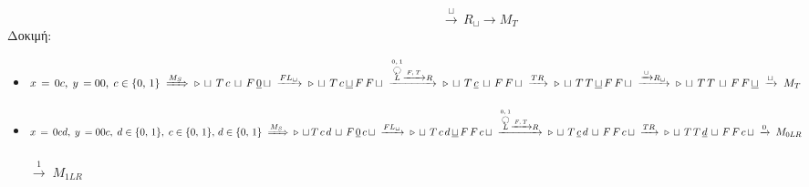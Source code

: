 \reducevspace\reducevspace\reducevspace\reducevspace\reducevspace\reducevspace\reducevspace\reducevspace\reducevspace
\reducevspace\reducevspace\reducevspace\reducevspace\reducevspace\reducevspace\reducevspace\reducevspace\reducevspace
\reducevspace\reducevspace\reducevspace\reducevspace\reducevspace\reducevspace\reducevspace\reducevspace\reducevspace
\reducevspace\reducevspace\reducevspace\reducevspace\reducevspace\reducevspace\reducevspace\reducevspace\reducevspace
\[\qquad\qquad\qquad\qquad\qquad\qquad\;\;\xrightarrow{\sqcup}\, R_\sqcup \rightarrow M_T\]
\reducevspace\reducevspace\reducevspace\reducevspace\reducevspace\reducevspace\reducevspace\reducevspace\reducevspace
Δοκιμή:
\reducevspace\reducevspace\reducevspace\reducevspace\reducevspace\reducevspace\reducevspace\reducevspace\reducevspace
\begin{itemize}
	\itemsep0em
	\item $x\,=\,0c,\; y\,=00,\; c\in\{0,\,1\} \;\xRightarrow{M_S}\;
	\triangleright\, \sqcup\, T\, c\, \sqcup\, F\, \underline{0}\, \sqcup\; \xrightarrow{FL_\sqcup}\;
	\triangleright\, \sqcup\, T\, c\, \underline{\sqcup}\, F\, F\, \sqcup\;
	\xrightarrow{\overset{0,\,1}{\overset{\botcircleleft}{L}}\xrightarrow{F,\,T}R}\;
	\triangleright\, \sqcup\, T\, \underline{c}\, \sqcup\, F\, F\, \sqcup\; \xrightarrow{TR}\;
	\triangleright\, \sqcup\, T\, T\, \underline{\sqcup}\, F\, F\, \sqcup\;
	\xrightarrow{\xrightarrow{\sqcup}R_\sqcup}\;
	\triangleright\, \sqcup\, T\, T\, \sqcup\, F\, F\, \underline{\sqcup}\; \xrightarrow{\sqcup}\; M_T
	\quad$ \textcolor{green}{}
	\clearpage
	\item $x\,=\,0cd,\; y\,=00c,\; d\in \{0,\,1\},\; c\in\{0,\,1\},\,d\in\{0,\,1\} \;\xRightarrow{M_S}\\
	\triangleright\, \sqcup\, T\, c\, d\, \sqcup\, F\, \underline{0}\, c\, \sqcup\; \xrightarrow{FL_\sqcup}\;
	\triangleright\, \sqcup\, T\, c\, d\, \underline{\sqcup}\, F\, F\, c\, \sqcup\;
	\xrightarrow{\overset{0,\,1}{\overset{\botcircleleft}{L}}\xrightarrow{F,\,T}R}\;
	\triangleright\, \sqcup\, T\, \underline{c}\, d\, \sqcup\, F\, F\, c\, \sqcup\; \xrightarrow{TR}\;
	\triangleright\, \sqcup\, T\, T\, \underline{d}\, \sqcup\, F\, F\, c\, \sqcup\; \xrightarrow{0}\; M_{0LR}
	\quad$ \textcolor{green}{}\\
	\makebox[3.8cm]{\hfill}$\xrightarrow{1}\; M_{1LR} \quad$ \textcolor{green}{}
\end{itemize}



